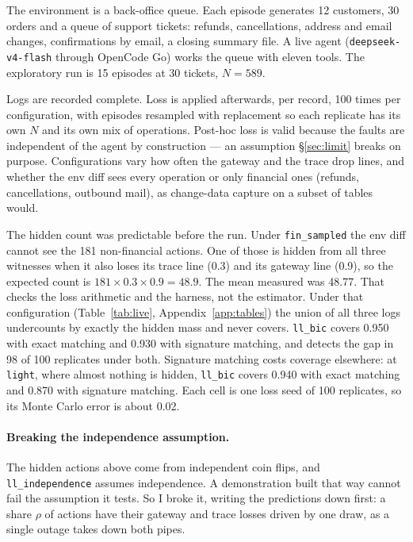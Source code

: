 \documentclass[11pt]{article}
\begin{document}
The environment is a back-office queue. Each episode generates 12 customers, 30
orders and a queue of support tickets: refunds, cancellations, address and email
changes, confirmations by email, a closing summary file. A live agent
(\texttt{deepseek-v4-flash} through OpenCode Go) works the queue with eleven tools.
The exploratory run is 15 episodes at 30 tickets, $N = 589$.

Logs are recorded complete. Loss is applied afterwards, per record, 100 times per
configuration, with episodes resampled with replacement so each replicate has its
own $N$ and its own mix of operations. Post-hoc loss is valid because the faults
are independent of the agent by construction --- an assumption \S\ref{sec:limit}
breaks on purpose. Configurations vary how often the gateway and the trace drop
lines, and whether the env diff sees every operation or only financial ones
(refunds, cancellations, outbound mail), as change-data capture on a subset of
tables would.


The hidden count was predictable before the run. Under \texttt{fin\_sampled} the
env diff cannot see the 181 non-financial actions. One of those is hidden from all
three witnesses when it also loses its trace line (0.3) and its gateway line
(0.9), so the expected count is $181 \times 0.3 \times 0.9 = 48.9$. The mean measured was 48.77.
That checks the loss arithmetic and the harness, not the estimator. Under that
configuration (Table~\ref{tab:live}, Appendix~\ref{app:tables}) the union of all three logs undercounts by
exactly the hidden mass and never covers. \texttt{ll\_bic} covers 0.950 with exact
matching and 0.930 with signature matching, and detects the gap in 98 of 100
replicates under both. Signature matching costs coverage elsewhere: at
\texttt{light}, where almost nothing is hidden, \texttt{ll\_bic} covers 0.940 with
exact matching and 0.870 with signature matching. Each cell is one loss seed of
100 replicates, so its Monte Carlo error is about 0.02.

\paragraph{Breaking the independence assumption.}
The hidden actions above come from independent coin flips, and
\texttt{ll\_independence} assumes independence. A demonstration built that way
cannot fail the assumption it tests. So I broke it, writing the predictions down
first: a share $\rho$ of actions have their gateway and trace losses driven by one
draw, as a single outage takes down both pipes.
\end{document}
